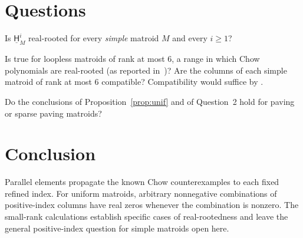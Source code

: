 \documentclass[a4paper,envcountsame,runningheads]{llncs}
\newcommand{\uH}{\underline{\mathsf H}}
\begin{document}
\section{Questions}

\begin{question}
Is $\uH^i_M$ real-rooted for every \emph{simple} matroid $M$ and every $i\ge1$?
\end{question}

\begin{question}
Is \cite[Conj.~1.5]{BV} true for loopless matroids of rank at most $6$, a range in which Chow polynomials are real-rooted (as reported in~\cite{BCEL})? Are the columns of each simple matroid of rank at most $6$ compatible? Compatibility would suffice by .
\end{question}

\begin{question}
Do the conclusions of Proposition~\ref{prop:unif} and of Question~2 hold for paving or sparse paving matroids?
\end{question}



\section{Conclusion}

Parallel elements propagate the known Chow counterexamples to each fixed refined index. For uniform matroids, arbitrary nonnegative combinations of positive-index columns have real zeros whenever the combination is nonzero. The small-rank calculations establish specific cases of real-rootedness and leave the general positive-index question for simple matroids open here.



\end{document}
